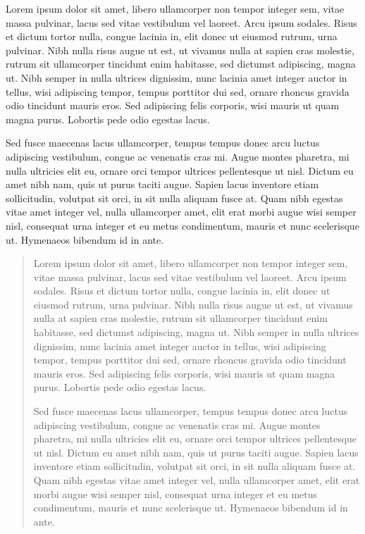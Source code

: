 
\begin{resumo}

Lorem ipsum dolor sit amet, libero ullamcorper non tempor integer sem, vitae massa pulvinar, lacus sed vitae vestibulum vel laoreet. Arcu ipsum sodales. Risus et dictum tortor nulla, congue lacinia in, elit donec ut eiusmod rutrum, urna pulvinar. Nibh nulla risus augue ut est, ut vivamus nulla at sapien cras molestie, rutrum sit ullamcorper tincidunt enim habitasse, sed dictumst adipiscing, magna ut. Nibh semper in nulla ultrices dignissim, nunc lacinia amet integer auctor in tellus, wisi adipiscing tempor, tempus porttitor dui sed, ornare rhoncus gravida odio tincidunt mauris eros. Sed adipiscing felis corporis, wisi mauris ut quam magna purus. Lobortis pede odio egestas lacus.

Sed fusce maecenas lacus ullamcorper, tempus tempus donec arcu luctus adipiscing vestibulum, congue ac venenatis cras mi. Augue montes pharetra, mi nulla ultricies elit eu, ornare orci tempor ultrices pellentesque ut nisl. Dictum eu amet nibh nam, quis ut purus taciti augue. Sapien lacus inventore etiam sollicitudin, volutpat sit orci, in sit nulla aliquam fusce at. Quam nibh egestas vitae amet integer vel, nulla ullamcorper amet, elit erat morbi augue wisi semper nisl, consequat urna integer et eu metus condimentum, mauris et nunc scelerisque ut. Hymenaeos bibendum id in ante.

\end{resumo}

\begin{abstract}

Lorem ipsum dolor sit amet, libero ullamcorper non tempor integer sem, vitae massa pulvinar, lacus sed vitae vestibulum vel laoreet. Arcu ipsum sodales. Risus et dictum tortor nulla, congue lacinia in, elit donec ut eiusmod rutrum, urna pulvinar. Nibh nulla risus augue ut est, ut vivamus nulla at sapien cras molestie, rutrum sit ullamcorper tincidunt enim habitasse, sed dictumst adipiscing, magna ut. Nibh semper in nulla ultrices dignissim, nunc lacinia amet integer auctor in tellus, wisi adipiscing tempor, tempus porttitor dui sed, ornare rhoncus gravida odio tincidunt mauris eros. Sed adipiscing felis corporis, wisi mauris ut quam magna purus. Lobortis pede odio egestas lacus.

Sed fusce maecenas lacus ullamcorper, tempus tempus donec arcu luctus adipiscing vestibulum, congue ac venenatis cras mi. Augue montes pharetra, mi nulla ultricies elit eu, ornare orci tempor ultrices pellentesque ut nisl. Dictum eu amet nibh nam, quis ut purus taciti augue. Sapien lacus inventore etiam sollicitudin, volutpat sit orci, in sit nulla aliquam fusce at. Quam nibh egestas vitae amet integer vel, nulla ullamcorper amet, elit erat morbi augue wisi semper nisl, consequat urna integer et eu metus condimentum, mauris et nunc scelerisque ut. Hymenaeos bibendum id in ante.

\end{abstract}
